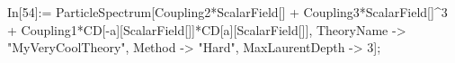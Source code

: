 In[54]:= ParticleSpectrum[Coupling2*ScalarField[] + Coupling3*ScalarField[]^3 + Coupling1*CD[-a][ScalarField[]]*CD[a][ScalarField[]], TheoryName -> "MyVeryCoolTheory", Method -> "Hard", MaxLaurentDepth -> 3]; 